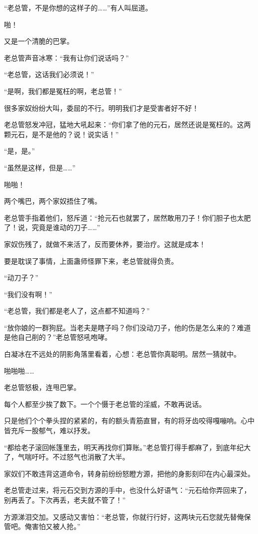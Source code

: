\begin{this_body}
“老总管，不是你想的这样子的……”有人叫屈道。

啪！

又是一个清脆的巴掌。

老总管声音冰寒：“我有让你们说话吗？”

“老总管，这话我们必须说！”

“是啊，我们都是冤枉的啊，老总管！”

很多家奴纷纷大叫，委屈的不行。明明我们才是受害者好不好！

老总管怒发冲冠，猛地大吼起来：“你们拿了他的元石，居然还说是冤枉的。这两颗元石，是不是他的？说！说实话！”

“是，是。”

“虽然是这样，但是……”

啪啪！

两个嘴巴，两个家奴捂住了嘴。

老总管手指着他们，怒斥道：“抢元石也就罢了，居然敢用刀子！你们胆子也太肥了！说，究竟是谁动的刀子……”

家奴伤残了，就做不来活了，反而要休养，要治疗。这就是成本！

要是耽误了事情，上面蛊师怪罪下来，老总管就得负责。

“动刀子？”

“我们没有啊！”

“老总管，我们都是老人了，这点都不知道吗？”

“放你娘的一群狗屁。当老夫是瞎子吗？你们没动刀子，他的伤是怎么来的？难道是他自己削的？”老总管怒吼咆哮。

白凝冰在不远处的阴影角落里看着，心想：老总管你真聪明。居然一猜就中。

啪啪啪……

老总管怒极，连甩巴掌。

每个人都至少挨了数下。一个个慑于老总管的淫威，不敢再说话。

只是他们个个拳头捏的紧紧的，有的额头青筋直冒，有的将牙齿咬得嘎嘣响。心中皆充斥一股郁气，难以抒发。

“都给老子滚回帐篷里去，明天再找你们算账。”老总管打得手都麻了，到底年纪大了，气喘吁吁。不过怒气也消散了大半。

家奴们不敢违背这道命令，转身前纷纷怒瞪方源，把他的身影刻印在内心最深处。

老总管走过来，将元石交到方源的手中，也没什么好语气：“元石给你弄回来了，别再丢了。下次再丢，老夫就不管了！”

方源涕泪交加。又感动又害怕：“老总管，你就行行好，这两块元石您就先替俺保管吧。俺害怕又被人抢。”


\end{this_body}
